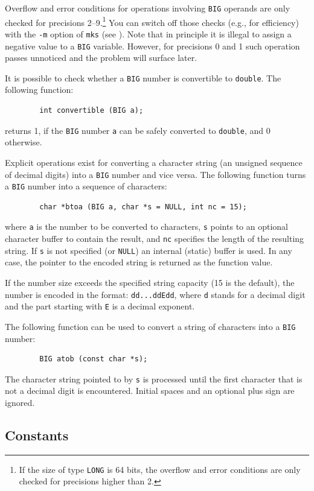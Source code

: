 Overflow and error conditions for operations involving
{\tt BIG} operands are only checked for precisions 2--9.\footnote{If the size
of type {\tt LONG} is 64 bits, the overflow and error conditions are only
checked for precisions higher than 2.}
You can switch off those checks (e.g., for efficiency) with
the {\tt -m} option of {\tt mks} (see ).
Note that in principle it is illegal to assign a negative value to a
{\tt BIG} variable.
However, for precisions 0 and 1 such operation passes unnoticed and
the problem will surface later.

It is possible to check whether a {\tt BIG} number is convertible to
{\tt double}.
The following function:
\begin{verbatim}
        int convertible (BIG a);
\end{verbatim}
returns 1, if the {\tt BIG} number {\tt a} can be safely
converted to {\tt double}, and 0 otherwise.

Explicit operations exist for converting a character string (an unsigned
sequence of decimal digits) into a {\tt BIG} number and vice versa.
The following function turns a {\tt BIG} number into a
sequence of characters:
\begin{verbatim}
        char *btoa (BIG a, char *s = NULL, int nc = 15);
\end{verbatim}
where {\tt a} is the number to be converted to characters, {\tt s} points
to an optional character buffer to contain the result, and {\tt nc}
specifies the length of the resulting string.
If {\tt s} is not specified (or {\tt NULL}) an internal (static)
buffer is used.
In any case, the pointer to the encoded string is returned as the function
value.

If the number size exceeds the specified string capacity (15 is the default),
the number is encoded in the format: {\tt dd...ddEdd}, where {\tt d} stands
for a decimal digit and the part starting with {\tt E} is a decimal exponent.

The following function can be used to convert a string of characters into
a {\tt BIG} number:
\begin{verbatim}
        BIG atob (const char *s);
\end{verbatim}

The character string pointed to by {\tt s} is processed until the first
character that is not a decimal digit is encountered.
Initial spaces and an optional plus sign are ignored.

\subsection {Constants}
\label {rm_mp_co}

